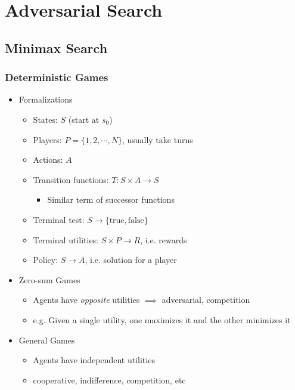 \section{Adversarial Search}

\subsection{Minimax Search}

\subsubsection*{Deterministic Games}
\begin{itemize}
    \item Formalizations
    \begin{itemize}
        \item States: $S$ (start at $s_0$)
        \item Players: $P=\{1,2,\cdots,N\}$, usually take turns
        \item Actions: $A$
        \item Transition functions: $T:S\times A\to S$
        \begin{itemize}
            \item Similar term of successor functions
        \end{itemize}
        \item Terminal test: $S\to\{\text{true},\text{false}\}$
        \item Terminal utilities: $S\times P\to R$, i.e. rewards
        \item Policy: $S\to A$, i.e. solution for a player
    \end{itemize}
    \item Zero-sum Games
    \begin{itemize}
        \item Agents have \textit{opposite} utilities $\implies$ adversarial, competition
        \item e.g. Given a single utility, one maximizes it and the other minimizes it
    \end{itemize}
    \item General Games
    \begin{itemize}
        \item Agents have independent utilities
        \item cooperative, indifference, competition, etc
    \end{itemize}
\end{itemize}

